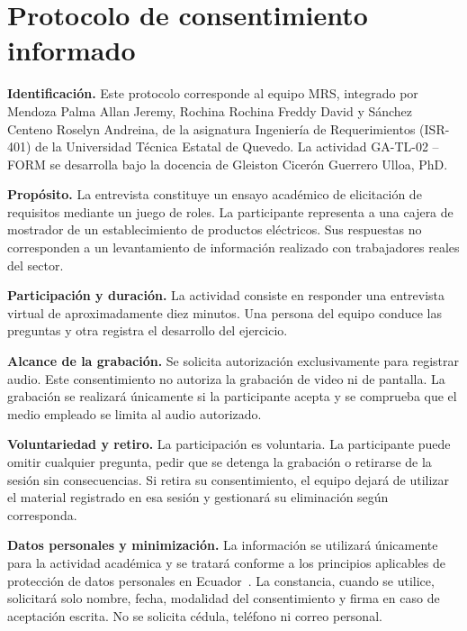 \clearpage
\section{Protocolo de consentimiento informado}
\label{sec:consentimiento-informado}
\begingroup
\small
\setlength{\parskip}{3pt}

\noindent\textbf{Identificación.} Este protocolo corresponde al equipo MRS, integrado por Mendoza Palma Allan Jeremy, Rochina Rochina Freddy David y Sánchez Centeno Roselyn Andreina, de la asignatura Ingeniería de Requerimientos (ISR-401) de la Universidad Técnica Estatal de Quevedo. La actividad GA-TL-02 -- FORM se desarrolla bajo la docencia de Gleiston Cicerón Guerrero Ulloa, PhD.

\noindent\textbf{Propósito.} La entrevista constituye un ensayo académico de elicitación de requisitos mediante un juego de roles. La participante representa a una cajera de mostrador de un establecimiento de productos eléctricos. Sus respuestas no corresponden a un levantamiento de información realizado con trabajadores reales del sector.

\noindent\textbf{Participación y duración.} La actividad consiste en responder una entrevista virtual de aproximadamente diez minutos. Una persona del equipo conduce las preguntas y otra registra el desarrollo del ejercicio.

\noindent\textbf{Alcance de la grabación.} Se solicita autorización exclusivamente para registrar audio. Este consentimiento no autoriza la grabación de video ni de pantalla. La grabación se realizará únicamente si la participante acepta y se comprueba que el medio empleado se limita al audio autorizado.

\noindent\textbf{Voluntariedad y retiro.} La participación es voluntaria. La participante puede omitir cualquier pregunta, pedir que se detenga la grabación o retirarse de la sesión sin consecuencias. Si retira su consentimiento, el equipo dejará de utilizar el material registrado en esa sesión y gestionará su eliminación según corresponda.

\noindent\textbf{Datos personales y minimización.} La información se utilizará únicamente para la actividad académica y se tratará conforme a los principios aplicables de protección de datos personales en Ecuador~\cite{lopdp2021}. La constancia, cuando se utilice, solicitará solo nombre, fecha, modalidad del consentimiento y firma en caso de aceptación escrita. No se solicita cédula, teléfono ni correo personal.

